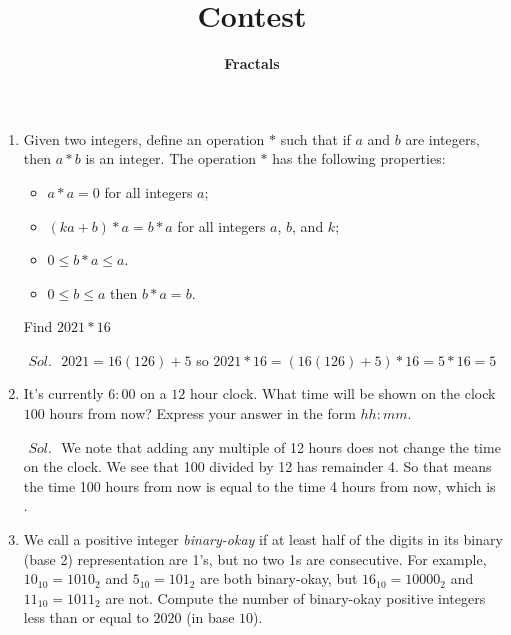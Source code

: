 \documentclass[a4paper]{article}
\theoremstyle{definition}
\begin{document}
\author{\textbf{Fractals}}
\title{\textbf{Contest}}
\maketitle
\noindent


\begin{enumerate}
    \item
Given two integers, define an operation $*$ such that if $a$ and $b$ are integers, then $a*b$ is an integer.
The operation $*$ has the following properties:
\begin{itemize}
    \item $a*a = 0$ for all integers $a$;
    \item $(ka+b)*a = b* a$ for all integers $a$, $b$, and $k$;
    \item $0 \leq b*a \le a$.
    \item $0 \leq b \le a$ then $b*a = b$.
\end{itemize}
Find $2021 * 16$

\begin{tcolorbox}[width=\linewidth, sharp corners=all, colback=white!95!black]
$\textit{ Sol. }$
$ 2021 = 16(126) + 5 $ so $2021 * 16 = (16(126) + 5) * 16 = 5 * 16
= \boxed{5}$

\end{tcolorbox}


\item It’s currently $6:00$ on a $12$ hour clock. What time will be shown on the clock $100$ hours from
now? Express your answer in the form $hh : mm$.

\begin{tcolorbox}[width=\linewidth, sharp corners=all, colback=white!95!black]

$\textit{ Sol. }$
We note that adding any multiple of 12 hours does not change the time on the clock.
We see that 100 divided by 12 has remainder 4. So that means the time 100 hours from now is
equal to the time 4 hours from now, which is .
\end{tcolorbox}

\item We call a positive integer \textit{binary-okay} if at least half of the digits in its binary (base 2) representation are 1’s, but no two 1s are consecutive. For example, $10_{10} = 1010_2$ and $5_{10} = 101_2$
are both binary-okay, but $16_{10} = {10000}_2$ and $11_{10} = {1011}_2$ are not. Compute the number of
binary-okay positive integers less than or equal to $2020$ (in base $10$).


\end{enumerate}
\end{document}
